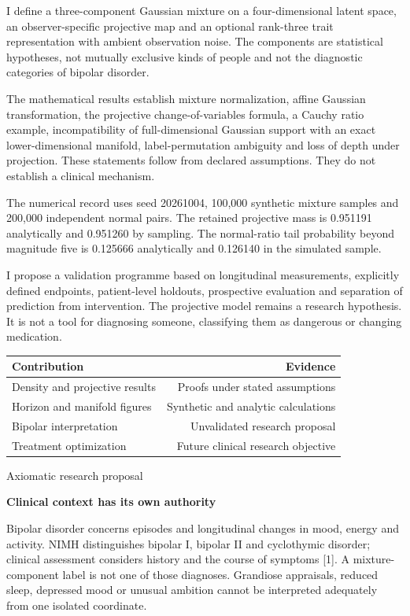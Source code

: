 \documentclass[10pt]{article}
\begin{document}
I define a three-component Gaussian mixture on a four-dimensional latent space, an observer-specific projective map and an optional rank-three trait representation with ambient observation noise. The components are statistical hypotheses, not mutually exclusive kinds of people and not the diagnostic categories of bipolar disorder.\par
The mathematical results establish mixture normalization, affine Gaussian transformation, the projective change-of-variables formula, a Cauchy ratio example, incompatibility of full-dimensional Gaussian support with an exact lower-dimensional manifold, label-permutation ambiguity and loss of depth under projection. These statements follow from declared assumptions. They do not establish a clinical mechanism.\par
The numerical record uses seed 20261004, 100,000 synthetic mixture samples and 200,000 independent normal pairs. The retained projective mass is 0.951191 analytically and 0.951260 by sampling. The normal-ratio tail probability beyond magnitude five is 0.125666 analytically and 0.126140 in the simulated sample.\par
I propose a validation programme based on longitudinal measurements, explicitly defined endpoints, patient-level holdouts, prospective evaluation and separation of prediction from intervention. The projective model remains a research hypothesis. It is not a tool for diagnosing someone, classifying them as dangerous or changing medication.\par
{\small\begin{tabularx}{\linewidth}{Xr}\toprule
Contribution & Evidence\\\midrule
Density and projective results & Proofs under stated assumptions\\
Horizon and manifold figures & Synthetic and analytic calculations\\
Bipolar interpretation & Unvalidated research proposal\\
Treatment optimization & Future clinical research objective\\
\bottomrule\end{tabularx}}\par
\clearpage
{\small\color{accent}Axiomatic research proposal}\par
{\LARGE\bfseries\color{ink}Clinical context has its own authority}\par\vspace{7pt}
Bipolar disorder concerns episodes and longitudinal changes in mood, energy and activity. NIMH distinguishes bipolar I, bipolar II and cyclothymic disorder; clinical assessment considers history and the course of symptoms [1]. A mixture-component label is not one of those diagnoses. Grandiose appraisals, reduced sleep, depressed mood or unusual ambition cannot be interpreted adequately from one isolated coordinate.\par
\end{document}
